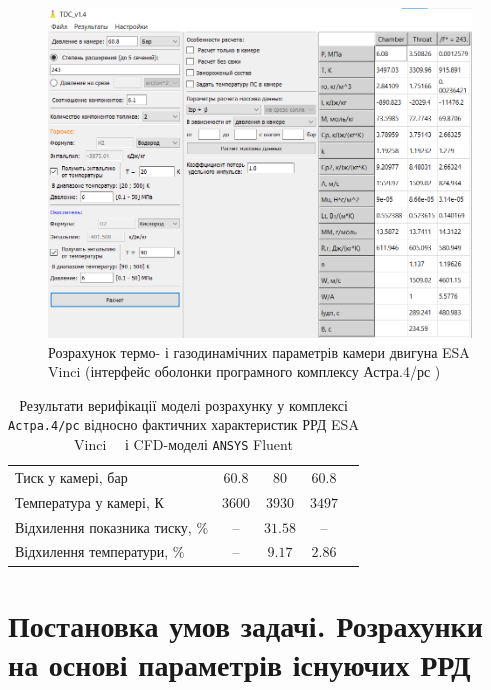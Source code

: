 \begin{figure}
	\centering
	\includegraphics[width=0.7\textheight, angle=0,origin=c]{chapter_2/Vinci_1perc_pure.png}
	\caption{Розрахунок термо- і газодинамічних параметрів камери двигуна ESA Vinci (інтерфейс оболонки програмного комплексу Астра.4/рс )}
	\label{fig:Vinci_1perc_pure}
\end{figure}

\begin{table}[t!]\centering\small
	\caption{Результати верифікації моделі розрахунку у комплексі \texttt{Астра.4/рс} відносно фактичних характеристик РРД ESA Vinci~\cite{VinciData}~\cite{VinciDataDLR} і CFD-моделі \texttt{ANSYS} Fluent}
	\begin{tabular}{|l|c|c|c|c|}
		\hline
		\thead{} & \thead{Література} & \thead{Fluent} & \thead{Астра.4}\\
		\hline
		Тиск у камері, бар & $60.8$ & $80$ & $60.8$\\
		\hline
		Температура у камері, К & $3600$ & $3930$ & $3497$ \\
		\hline
		Відхилення показника тиску, \% & -- & $31.58$ & -- \\
		\hline
		Відхилення температури, \% & -- & $9.17$ & $2.86$ \\		
		\hline
	\end{tabular}
	\label{tab_verification}
\end{table}	


\section{Постановка умов задачі. Розрахунки на основі параметрів існуючих РРД}


